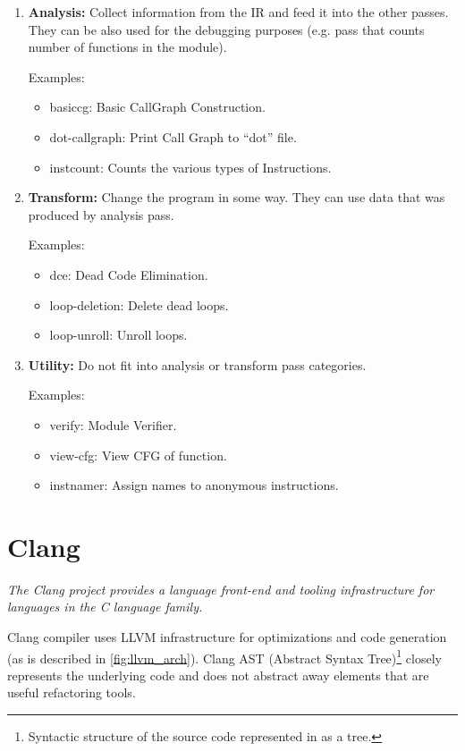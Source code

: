 \documentclass[12pt, twoside]{fithesis2}
\renewcommand{\_}{\leavevmode \kern0.07em\vbox{\hrule width0.4em}}
\newcommand{\squarebullet}{\textcolor{black}{\raisebox{0.15em}{\rule{4pt}{4pt}}}}
\newenvironment{myItemize}{
  \begin{itemize}[
    leftmargin=2em,
    rightmargin=1em,
    itemsep=\parskip,
    parsep=0em,
    topsep=0em,
    partopsep=0em
]
  \renewcommand{\labelitemi}{\squarebullet}
  \renewcommand{\labelitemii}{\textbullet}
}{
  \end{itemize}
}
\newenvironment{myEnumerate}{
  \begin{enumerate}[
    leftmargin=2em,
    rightmargin=1em,
    itemsep=\parskip,
    parsep=0em,
    topsep=0em,
    partopsep=0em
]
}{
  \end{enumerate}
}
\begin{document}
\begin{myEnumerate}
\item \textbf{Analysis:} Collect information from the IR and feed it into
the other passes. They can be also used for the debugging purposes (e.g.
pass that counts number of functions in the module).

Examples:
\begin{myItemize}
\item basiccg: Basic CallGraph Construction.
\item dot-callgraph: Print Call Graph to “dot” file.
\item instcount: Counts the various types of Instructions.
\end{myItemize}

\item \textbf{Transform:} Change the program in some way. They can use
data that was produced by analysis pass.

Examples:
\begin{myItemize}
\item dce: Dead Code Elimination.
\item loop-deletion: Delete dead loops.
\item loop-unroll: Unroll loops.
\end{myItemize}

\item \textbf{Utility:} Do not fit into analysis or transform pass categories.

Examples:
\begin{myItemize}
\item verify: Module Verifier.
\item view-cfg: View CFG of function.
\item instnamer: Assign names to anonymous instructions.
\end{myItemize}

\end{myEnumerate}


\section{Clang}
\label{sec:llvm-clang}

\emph{The Clang project provides a language front-end and tooling
infrastructure for languages in the C language family.}\cite{clang}

Clang compiler uses LLVM infrastructure for optimizations and code generation
(as is described in \autoref{fig:llvm_arch}).
Clang AST (Abstract Syntax Tree)\footnote{
Syntactic structure of the source code represented in as a tree.
} closely represents the underlying code and does not abstract away elements
that are useful refactoring tools\cite{clang-ast}.
\end{document}
